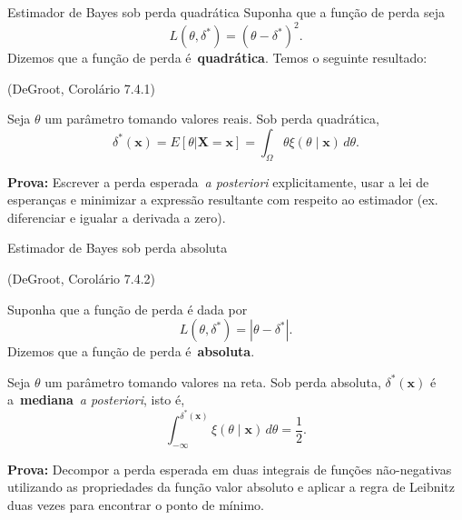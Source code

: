 \begin{frame}{Estimador de Bayes sob perda quadrática}
Suponha que a função de perda seja 
\[ L(\theta, \delta^\ast) =  (\theta-\delta^\ast)^2. \]
Dizemos que a função de perda é~\textbf{quadrática}.
Temos o seguinte resultado:
 \begin{theo}
  \label{thm:posterior_mean_quadratic}
  (DeGroot, Corolário 7.4.1)
  
  Seja $\theta$ um parâmetro tomando valores reais.
  Sob perda quadrática,
  $$\delta^\ast(\boldsymbol{x}) = E[\theta | \boldsymbol{X} = \boldsymbol{x}] = \int_{\Omega} \theta \xi(\theta \mid \boldsymbol{x} ) \,d\theta.$$
 \end{theo}
 \textbf{Prova:} Escrever a perda esperada~\textit{a posteriori} explicitamente, usar a lei de esperanças e minimizar a expressão resultante com respeito ao estimador (ex. diferenciar e igualar a derivada a zero).
\end{frame}

\begin{frame}{Estimador de Bayes sob perda absoluta}
 \begin{theo}
  \label{thm:posterior_median_absolute}
  (DeGroot, Corolário 7.4.2)
  
  Suponha que a função de perda é dada por  
\[ L(\theta, \delta^\ast) =  |\theta-\delta^\ast|. \]
Dizemos que a função de perda é~\textbf{absoluta}.
  
  Seja $\theta$ um parâmetro tomando valores na reta.
  Sob perda absoluta, $\delta^\ast(\boldsymbol{x})$ é a~\textbf{mediana}~\textit{a posteriori}, isto é,
  $$\int_{-\infty}^{\delta^\ast(\boldsymbol{x})}\xi(\theta \mid \boldsymbol{x} ) \,d\theta = \frac{1}{2}.$$
 \end{theo}
 \textbf{Prova:} Decompor a perda esperada em duas integrais de funções não-negativas utilizando as propriedades da função valor absoluto e aplicar a regra de Leibnitz duas vezes para encontrar o ponto de mínimo.
\end{frame}


